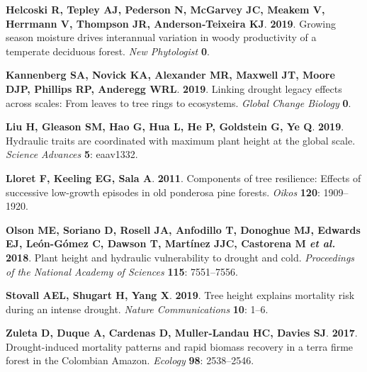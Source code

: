 \documentclass[
]{article}
\begin{document}
\leavevmode\hypertarget{ref-helcoski_growing_2019}{}%
\textbf{\textnormal{Helcoski R}, \textnormal{Tepley AJ},
\textnormal{Pederson N}, \textnormal{McGarvey JC}, \textnormal{Meakem
V}, \textnormal{Herrmann V}, \textnormal{Thompson JR},
\textnormal{Anderson‐Teixeira KJ}}. \textbf{2019}. Growing season
moisture drives interannual variation in woody productivity of a
temperate deciduous forest. \emph{New Phytologist} \textbf{0}.

\leavevmode\hypertarget{ref-kannenberg_linking_2019}{}%
\textbf{\textnormal{Kannenberg SA}, \textnormal{Novick KA},
\textnormal{Alexander MR}, \textnormal{Maxwell JT}, \textnormal{Moore
DJP}, \textnormal{Phillips RP}, \textnormal{Anderegg WRL}}.
\textbf{2019}. Linking drought legacy effects across scales: From leaves
to tree rings to ecosystems. \emph{Global Change Biology} \textbf{0}.

\leavevmode\hypertarget{ref-liu_hydraulic_2019}{}%
\textbf{\textnormal{Liu H}, \textnormal{Gleason SM}, \textnormal{Hao G},
\textnormal{Hua L}, \textnormal{He P}, \textnormal{Goldstein G},
\textnormal{Ye Q}}. \textbf{2019}. Hydraulic traits are coordinated with
maximum plant height at the global scale. \emph{Science Advances}
\textbf{5}: eaav1332.

\leavevmode\hypertarget{ref-lloret_components_2011}{}%
\textbf{\textnormal{Lloret F}, \textnormal{Keeling EG}, \textnormal{Sala
A}}. \textbf{2011}. Components of tree resilience: Effects of successive
low-growth episodes in old ponderosa pine forests. \emph{Oikos}
\textbf{120}: 1909--1920.

\leavevmode\hypertarget{ref-olson_plant_2018}{}%
\textbf{\textnormal{Olson ME}, \textnormal{Soriano D},
\textnormal{Rosell JA}, \textnormal{Anfodillo T}, \textnormal{Donoghue
MJ}, \textnormal{Edwards EJ}, \textnormal{León-Gómez C},
\textnormal{Dawson T}, \textnormal{Martínez JJC}, \textnormal{Castorena
M} \emph{et al.}} \textbf{2018}. Plant height and hydraulic
vulnerability to drought and cold. \emph{Proceedings of the National
Academy of Sciences} \textbf{115}: 7551--7556.

\leavevmode\hypertarget{ref-stovall_tree_2019}{}%
\textbf{\textnormal{Stovall AEL}, \textnormal{Shugart H},
\textnormal{Yang X}}. \textbf{2019}. Tree height explains mortality risk
during an intense drought. \emph{Nature Communications} \textbf{10}:
1--6.

\leavevmode\hypertarget{ref-zuleta_drought-induced_2017}{}%
\textbf{\textnormal{Zuleta D}, \textnormal{Duque A},
\textnormal{Cardenas D}, \textnormal{Muller‐Landau HC},
\textnormal{Davies SJ}}. \textbf{2017}. Drought-induced mortality
patterns and rapid biomass recovery in a terra firme forest in the
Colombian Amazon. \emph{Ecology} \textbf{98}: 2538--2546.
\end{document}
